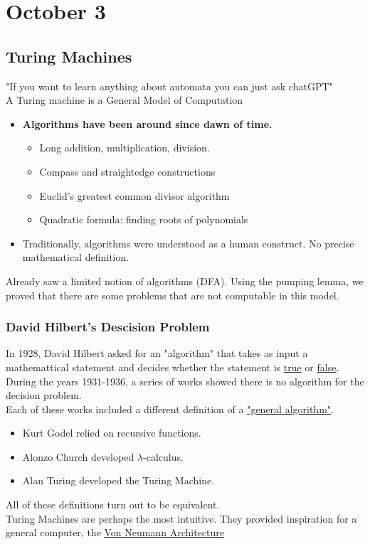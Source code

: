 \section{October 3}
\subsection{Turing Machines}
"If you want to learn anything about automata you can just ask chatGPT"
\\
A Turing machine is a General Model of Computation
\begin{itemize}
    \item \textbf{Algorithms have been around since dawn of time.}
          \begin{itemize} 
            \item Long addition, multiplication, division.
            \item Compass and straightedge constructions 
            \item Euclid's greatest common divisor algorithm  
            \item Quadratic formula: finding roots of polynomials
          \end{itemize}
    \item Traditionally, algorithms were understood as a human construct. No precise mathematical definition.  
\end{itemize}
Already saw a limited notion of algorithms (DFA). Using the pumping lemma, we proved that there are some problems that are not computable in this model.
\subsubsection{David Hilbert's Descision Problem}
In 1928, David Hilbert asked for an "algorithm" that takes as input a mathemattical statement and decides whether the statement is \underline{true} or \underline{false}.
\\
During the years 1931-1936, a series of works showed there is no algorithm for the decision problem.
\\
Each of these works included a different definition of a \underline{"general algorithm"}.
\begin{itemize}
  \item Kurt Godel relied on recursive functions.
  \item Alonzo Church developed $\lambda$-calculus.
  \item Alan Turing developed the Turing Machine.
\end{itemize}
All of these definitions turn out to be equivalent.
\\
Turing Machines are perhaps the most intuitive. They provided inspiration for a general computer, the \underline{Von Neumann Architecture}
\newpage
